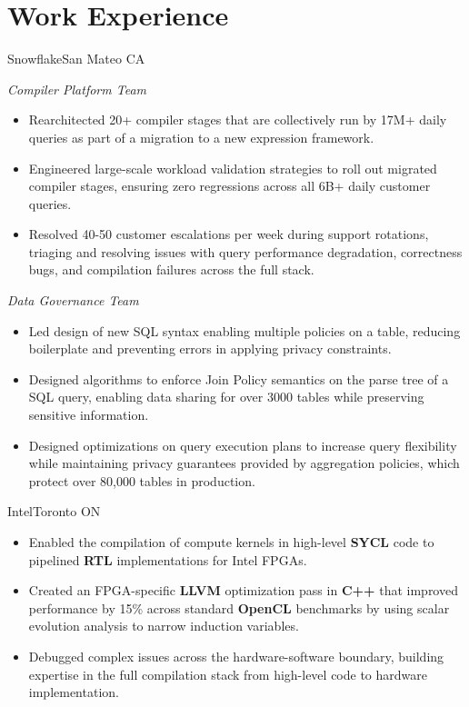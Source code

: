 \documentclass{moderncv}
\begin{document}
\section{Work Experience}

{Snowflake}{San Mateo CA}{}
{
    \textit{Compiler Platform Team}
    \begin{itemize}
        \item Rearchitected 20+ compiler stages that are collectively run by 17M+ daily queries as part of a migration to a new expression framework.
        \item Engineered large-scale workload validation strategies to roll out migrated compiler stages, ensuring zero regressions across all 6B+ daily customer queries.
        \item Resolved 40-50 customer escalations per week during support rotations, triaging and resolving issues  with query performance degradation, correctness bugs, and compilation failures across the full stack.
    \end{itemize}
    \textit{Data Governance Team}
    \begin{itemize}™
        \item Led design of new SQL syntax enabling multiple policies on a table, reducing boilerplate and preventing errors in applying privacy constraints.
        \item Designed algorithms to enforce Join Policy semantics on the parse tree of a SQL query, enabling data sharing for over 3000 tables while preserving sensitive information. %
        \item Designed optimizations on query execution plans to increase query flexibility while maintaining privacy guarantees provided by aggregation policies, which protect over 80,000 tables in production.
    \end{itemize}
}

{Intel}{Toronto ON}{}
{\begin{itemize}
    \item Enabled the compilation of compute kernels in high-level \textbf{SYCL} code to pipelined \textbf{RTL} implementations for Intel FPGAs.
    \item Created an FPGA-specific \textbf{LLVM} optimization pass in \textbf{C++} that improved performance by 15\% across standard \textbf{OpenCL} benchmarks by using scalar evolution analysis to narrow induction variables.
    \item Debugged complex issues across the hardware-software boundary, building expertise in the full compilation stack from high-level code to hardware implementation.
\end{itemize}}
\end{document}
